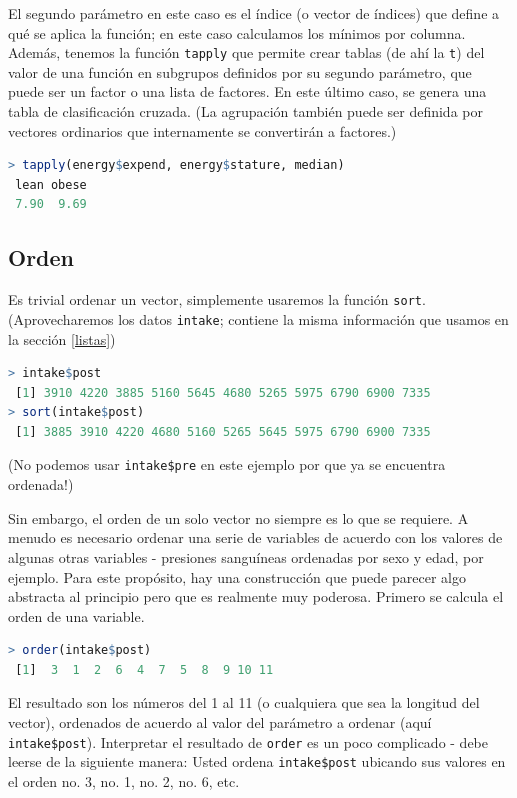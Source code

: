 \documentclass[spanish]{extbook}
\numberwithin{equation}{section}
\numberwithin{figure}{section}
\begin{document}
El segundo parámetro en este caso es el índice (o vector de índices) que define
a qué se aplica la función; en este caso calculamos los mínimos por columna.
Además, tenemos la función \texttt{tapply} que permite crear tablas (de ahí la
\texttt{t}) del valor de una función en subgrupos definidos por su segundo
parámetro, que puede ser un factor o una lista de factores. En este último
caso, se genera una tabla de clasificación cruzada. (La agrupación también
puede ser definida por vectores ordinarios que internamente se convertirán a
factores.)

\begin{lstlisting}[language=R]
> tapply(energy$expend, energy$stature, median)
 lean obese 
 7.90  9.69 
\end{lstlisting}

\subsection{Orden}

Es trivial ordenar un vector, simplemente usaremos la función \texttt{sort}.
(Aprovecharemos los datos \texttt{intake}; contiene la misma información que
usamos en la sección \ref{listas})

\begin{lstlisting}[language=R]
> intake$post
 [1] 3910 4220 3885 5160 5645 4680 5265 5975 6790 6900 7335
> sort(intake$post)
 [1] 3885 3910 4220 4680 5160 5265 5645 5975 6790 6900 7335
\end{lstlisting}

(No podemos usar \texttt{intake\$pre} en este ejemplo por que ya se encuentra
ordenada!)

Sin embargo, el orden de un solo vector no siempre es lo que se
requiere. A menudo es necesario ordenar una serie de variables de acuerdo con
los valores de algunas otras variables - presiones sanguíneas ordenadas por
sexo y edad, por ejemplo. Para este propósito, hay una construcción que puede
parecer algo abstracta al principio pero que es realmente muy poderosa. Primero
se calcula el orden de una variable.

\begin{lstlisting}[language=R]
> order(intake$post)
 [1]  3  1  2  6  4  7  5  8  9 10 11
\end{lstlisting}

El resultado son los números del 1 al 11 (o cualquiera que sea la longitud del
vector), ordenados de acuerdo al valor del parámetro a ordenar (aquí
\texttt{intake\$post}). Interpretar el resultado de \texttt{order} es un poco
complicado - debe leerse de la siguiente manera: Usted ordena \texttt{intake\$post}
ubicando sus valores en el orden no. 3, no. 1, no. 2, no. 6, etc.
\end{document}
